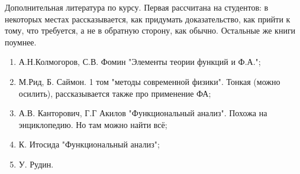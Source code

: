 \documentclass[document]{subfiles}
\begin{document}
Дополнительная литература по курсу. Первая рассчитана на студентов: в некоторых местах рассказывается, как придумать доказательство, как прийти к тому, что требуется,
а не в обратную сторону, как обычно. Остальные же книги поумнее.
\
\begin{enumerate}
    \item А.Н.Колмогоров, С.В. Фомин "Элементы теории функций и Ф.А.";
    \item М.Рид, Б. Саймон. 1 том "методы современной физики". Тонкая (можно осилить), рассказывается также про применение ФА;
    \item А.В. Канторович, Г.Г Акилов "Функциональный анализ". Похожа на энциклопедию. Но там можно найти всё;
    \item К. Итосида "Функциональный анализ";
    \item У. Рудин.
\end{enumerate}
\end{document}
